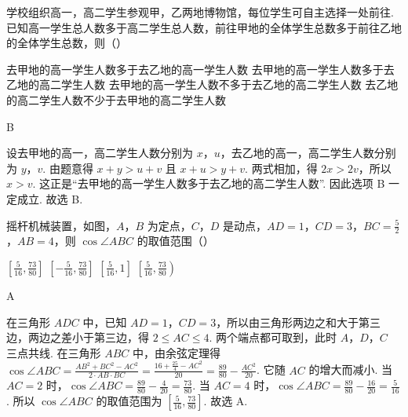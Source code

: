 \begin{problem}
学校组织高一，高二学生参观甲，乙两地博物馆，每位学生可自主选择一处前往. 已知高一学生总人数多于高二学生总人数，前往甲地的全体学生总数多于前往乙地的全体学生总数，则（\quad）

\choices
    {去甲地的高一学生人数多于去乙地的高一学生人数}
    {去甲地的高一学生人数多于去乙地的高二学生人数}
    {去甲地的高一学生人数不多于去乙地的高二学生人数}
    {去乙地的高二学生人数不少于去甲地的高二学生人数}
\end{problem}

\begin{answer}
B
\end{answer}

\begin{solution}
设去甲地的高一，高二学生人数分别为 \(x\)，\(u\)，去乙地的高一，高二学生人数分别为 \(y\)，\(v\). 由题意得 \( x+y>u+v \) 且 \( x+u>y+v \).
两式相加，得 \( 2x>2v \)，所以 \( x>v \). 这正是“去甲地的高一学生人数多于去乙地的高二学生人数”.
因此选项 B 一定成立. 故选 B.
\end{solution}

\begin{problem}
摇杆机械装置，如图，\(A\)，\(B\) 为定点，\(C\)，\(D\) 是动点，\( AD=1 \)，\( CD=3 \)，\( BC=\frac{5}{2} \)，\( AB=4 \)，则 \( \cos \angle ABC \) 的取值范围（\quad）


\choices
    {\( \left[ \frac{5}{16},\frac{73}{80} \right] \)}
    {\( \left[ -\frac{5}{16},\frac{73}{80} \right] \)}
    {\( \left[ \frac{5}{16},1 \right] \)}
    {\( \left[ \frac{5}{16},\frac{73}{80} \right) \)}
\end{problem}

\begin{answer}
A
\end{answer}

\begin{solution}
在三角形 \(ADC\) 中，已知 \( AD=1 \)，\( CD=3 \)，所以由三角形两边之和大于第三边，两边之差小于第三边，得 \( 2\le AC\le 4 \). 两个端点都可取到，此时 \(A\)，\(D\)，\(C\) 三点共线.
在三角形 \(ABC\) 中，由余弦定理得 \( \cos \angle ABC=\frac{AB^2+BC^2-AC^2}{2\cdot AB\cdot BC}=\frac{16+\frac{25}{4}-AC^2}{20}=\frac{89}{80}-\frac{AC^2}{20} \).
它随 \(AC\) 的增大而减小. 当 \( AC=2 \) 时，\( \cos \angle ABC=\frac{89}{80}-\frac{4}{20}=\frac{73}{80} \). 当 \( AC=4 \) 时，\( \cos \angle ABC=\frac{89}{80}-\frac{16}{20}=\frac{5}{16} \).
所以 \( \cos \angle ABC \) 的取值范围为 \( \left[ \frac{5}{16},\frac{73}{80} \right] \). 故选 A.
\end{solution}
